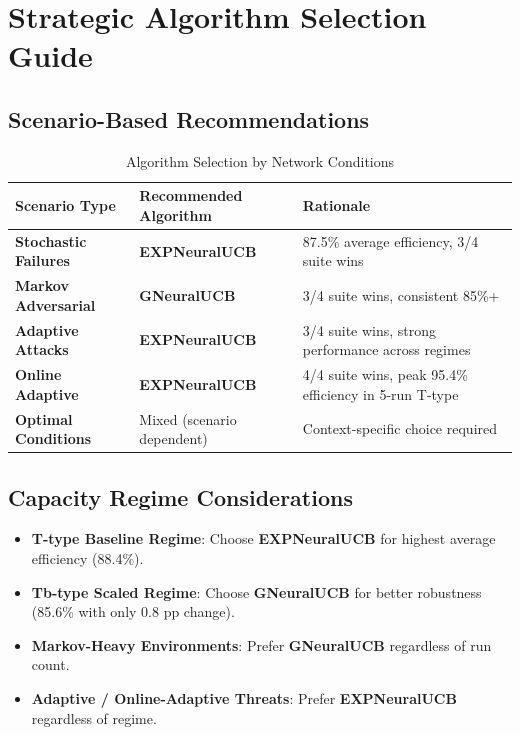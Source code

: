 \documentclass[11pt,a4paper]{article}
\begin{document}
\section{Strategic Algorithm Selection Guide}

\subsection{Scenario-Based Recommendations}

\begin{table}[H]
\centering
\caption{Algorithm Selection by Network Conditions}
\begin{tabular}{|l|l|l|}
\hline
\textbf{Scenario Type} & \textbf{Recommended Algorithm} & \textbf{Rationale} \\
\hline
\hline
\textbf{Stochastic Failures} & \textbf{EXPNeuralUCB} & 87.5\% average efficiency, 3/4 suite wins \\
\hline
\textbf{Markov Adversarial} & \textbf{GNeuralUCB} & 3/4 suite wins, consistent 85\%+ \\
\hline
\textbf{Adaptive Attacks} & \textbf{EXPNeuralUCB} & 3/4 suite wins, strong performance across regimes \\
\hline
\textbf{Online Adaptive} & \textbf{EXPNeuralUCB} & 4/4 suite wins, peak 95.4\% efficiency in 5-run T-type \\
\hline
\textbf{Optimal Conditions} & Mixed (scenario dependent) & Context-specific choice required \\
\hline
\end{tabular}
\end{table}

\subsection{Capacity Regime Considerations}

\begin{itemize}
\item \textbf{T-type Baseline Regime}: Choose \textbf{EXPNeuralUCB} for highest average efficiency (88.4\%).
\item \textbf{Tb-type Scaled Regime}: Choose \textbf{GNeuralUCB} for better robustness (85.6\% with only 0.8 pp change).
\item \textbf{Markov-Heavy Environments}: Prefer \textbf{GNeuralUCB} regardless of run count.
\item \textbf{Adaptive / Online-Adaptive Threats}: Prefer \textbf{EXPNeuralUCB} regardless of regime.
\end{itemize}
\end{document}
